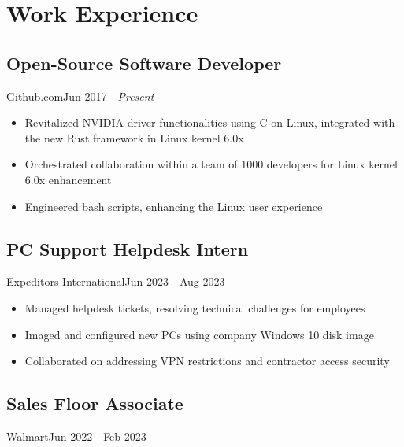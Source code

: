\section{Work Experience}
\subsection{Open-Source Software Developer}{Github.com}{Jun 2017 - \textit{Present}}
\begin{itemize}
    \item Revitalized NVIDIA driver functionalities using C on Linux, integrated with the new Rust framework in Linux kernel 6.0x
    \item Orchestrated collaboration within a team of 1000 developers for Linux kernel 6.0x enhancement
    \item Engineered bash scripts, enhancing the Linux user experience
\end{itemize}
\subsection{PC Support Helpdesk Intern}{Expeditors International}{Jun 2023 - Aug 2023}
\begin{itemize}
    \item Managed helpdesk tickets, resolving technical challenges for employees
    \item Imaged and configured new PCs using company Windows 10 disk image
    \item Collaborated on addressing VPN restrictions and contractor access security
\end{itemize}
\subsection{Sales Floor Associate}{Walmart}{Jun 2022 - Feb 2023}
